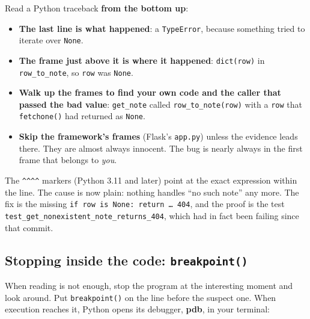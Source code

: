 \noindent{}Read a Python traceback \textbf{from the bottom up}:

\begin{itemize}
\tightlist
\item
  \textbf{The last line is what happened}: a \texttt{TypeError}, because something tried to iterate over \texttt{None}.
\item
  \textbf{The frame just above it is where it happened}: \texttt{dict(row)} in \texttt{row\_to\_note}, so \texttt{row} was \texttt{None}.
\item
  \textbf{Walk up the frames to find your own code and the caller that passed the bad value}: \texttt{get\_note} called \texttt{row\_to\_note(row)} with a \texttt{row} that \texttt{fetchone()} had returned as \texttt{None}.
\item
  \textbf{Skip the framework's frames} (Flask's \texttt{app.py}) unless the evidence leads there. They are almost always innocent. The bug is nearly always in the first frame that belongs to \emph{you}.
\end{itemize}

\noindent{}The \texttt{\^{}\^{}\^{}\^{}} markers (Python 3.11 and later) point at the exact expression within the line. The cause is now plain: nothing handles ``no such note'' any more. The fix is the missing \texttt{if\ row\ is\ None:}\allowbreak{}\texttt{\ return\ …\ 404}, and the proof is the test \texttt{test\_}\allowbreak{}\texttt{get\_}\allowbreak{}\texttt{nonexistent\_}\allowbreak{}\texttt{note\_}\allowbreak{}\texttt{returns\_}\allowbreak{}\texttt{404}, which had in fact been failing since that commit.

\subsection*{\texorpdfstring{Stopping inside the code: \texttt{breakpoint()}}{Stopping inside the code: breakpoint()}}\label{16-logging-error-handling:stopping-inside-the-code-breakpoint}

When reading is not enough, stop the program at the interesting moment and look around. Put \texttt{breakpoint()} on the line before the suspect one. When execution reaches it, Python opens its debugger, \textbf{pdb}, in your terminal:

\begin{codebox}[short]

\begin{Shaded}
\begin{Highlighting}[]
\OperatorTok{=}
    \NormalTok{()  }
\end{Highlighting}
\end{Shaded}

\end{codebox}

